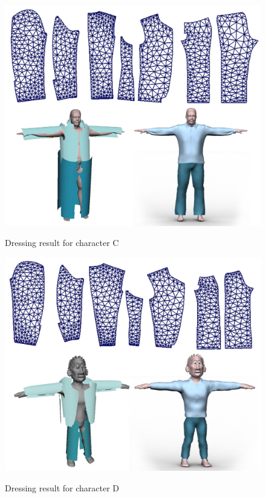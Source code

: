 \begin{figure}[H]
	\centering
	\includegraphics[width=0.9\columnwidth]{../images/resultC}\\
    \caption{Dressing result for character C}
    \label{figure:character_C_pattern}
\end{figure}


\begin{figure}[H]
	\centering
	\includegraphics[width=0.9\columnwidth]{../images/resultD}\\
    \caption{Dressing result for character D}
    \label{figure:character_D_pattern}
\end{figure}







